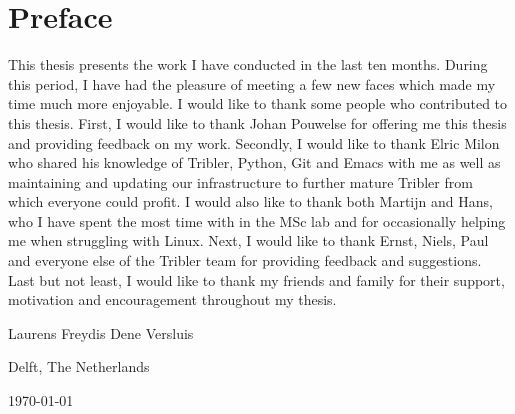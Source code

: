 \chapter*{Preface}
This thesis presents the work I have conducted in the last ten months.
During this period, I have had the pleasure of meeting a few new faces which made my time much more enjoyable.
I would like to thank some people who contributed to this thesis.
First, I would like to thank Johan Pouwelse for offering me this thesis and providing feedback on my work.
Secondly, I would like to thank Elric Milon who shared his knowledge of Tribler, Python, Git and Emacs with me as well as maintaining and updating our infrastructure to further mature Tribler from which everyone could profit.
I would also like to thank both Martijn and Hans, who I have spent the most time with in the MSc lab and for occasionally helping me when struggling with Linux.
Next, I would like to thank Ernst, Niels, Paul and everyone else of the Tribler team for providing feedback and suggestions.
Last but not least, I would like to thank my friends and family for their support, motivation and encouragement throughout my thesis.

\vspace{1\baselineskip}

\noindent
Laurens Freydis Dene Versluis

\vspace{1\baselineskip}

\noindent
Delft, The Netherlands

\noindent
\today